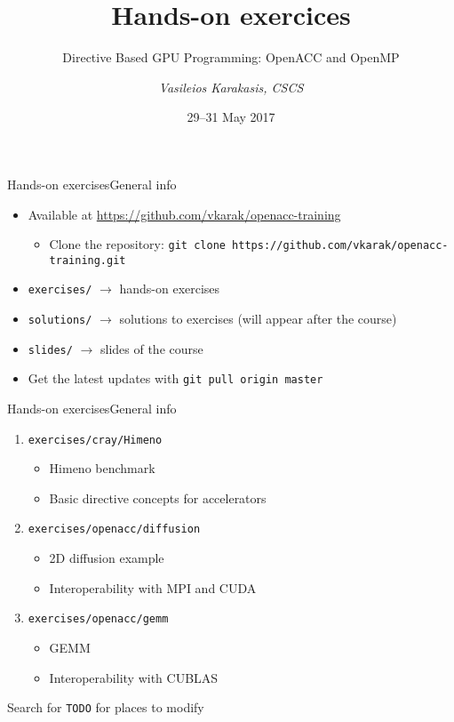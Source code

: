 \documentclass[aspectratio=169,12pt]{beamer}
\author{\emph{Vasileios Karakasis, CSCS}}
\title{Hands-on exercices}
\subtitle{Directive Based GPU Programming: OpenACC and OpenMP}
\date{29--31 May 2017}
\newcommand\shinline[2][]{\lstinline[style=shstyle,basicstyle=\ttfamily,#1]!#2!}
\begin{document}
\cscstitle

\begin{frame}[fragile]{Hands-on exercises}{General info}
  \begin{itemize}
  \item Available at \url{https://github.com/vkarak/openacc-training}
    \begin{itemize}
    \item Clone the repository: \shinline{git clone https://github.com/vkarak/openacc-training.git}
    \end{itemize}
  \item \shinline{exercises/} $\rightarrow$ hands-on exercises
  \item \shinline{solutions/} $\rightarrow$ solutions to exercises (will appear after the course)
  \item \shinline{slides/} $\rightarrow$ slides of the course
    \vfill
  \item Get the latest updates with
    \shinline{git pull origin master}
  \end{itemize}
\end{frame}

\begin{frame}[fragile]{Hands-on exercises}{General info}
  \begin{enumerate}
  \item \shinline{exercises/cray/Himeno}
    \begin{itemize}
    \item Himeno benchmark
    \item Basic directive concepts for accelerators
    \end{itemize}
  \item \shinline{exercises/openacc/diffusion}
    \begin{itemize}
    \item 2D diffusion example
    \item Interoperability with MPI and CUDA
    \end{itemize}
  \item \shinline{exercises/openacc/gemm}
    \begin{itemize}
    \item GEMM
    \item Interoperability with CUBLAS
    \end{itemize}
  \end{enumerate}
  \vfill
  Search for \texttt{TODO} for places to modify
\end{frame}
\end{document}
